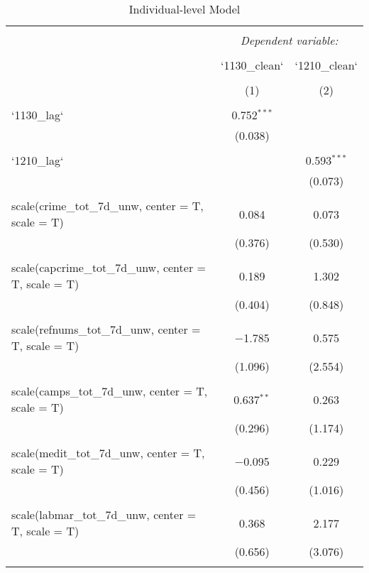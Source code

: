 
\begin{table}[!htbp] \centering 
  \caption{Individual-level Model} 
  \label{} 
\begin{tabular}{@{\extracolsep{5pt}}lcc} 
\\[-1.8ex]\hline 
\hline \\[-1.8ex] 
 & \multicolumn{2}{c}{\textit{Dependent variable:}} \\ 
\cline{2-3} 
\\[-1.8ex] & `1130\_clean` & `1210\_clean` \\ 
\\[-1.8ex] & (1) & (2)\\ 
\hline \\[-1.8ex] 
 `1130\_lag` & 0.752$^{***}$ &  \\ 
  & (0.038) &  \\ 
  & & \\ 
 `1210\_lag` &  & 0.593$^{***}$ \\ 
  &  & (0.073) \\ 
  & & \\ 
 scale(crime\_tot\_7d\_unw, center = T, scale = T) & 0.084 & 0.073 \\ 
  & (0.376) & (0.530) \\ 
  & & \\ 
 scale(capcrime\_tot\_7d\_unw, center = T, scale = T) & 0.189 & 1.302 \\ 
  & (0.404) & (0.848) \\ 
  & & \\ 
 scale(refnums\_tot\_7d\_unw, center = T, scale = T) & $-$1.785 & 0.575 \\ 
  & (1.096) & (2.554) \\ 
  & & \\ 
 scale(camps\_tot\_7d\_unw, center = T, scale = T) & 0.637$^{**}$ & 0.263 \\ 
  & (0.296) & (1.174) \\ 
  & & \\ 
 scale(medit\_tot\_7d\_unw, center = T, scale = T) & $-$0.095 & 0.229 \\ 
  & (0.456) & (1.016) \\ 
  & & \\ 
 scale(labmar\_tot\_7d\_unw, center = T, scale = T) & 0.368 & 2.177 \\ 
  & (0.656) & (3.076) \\ 
  & & \\ 

\end{tabular}
\end{table}
